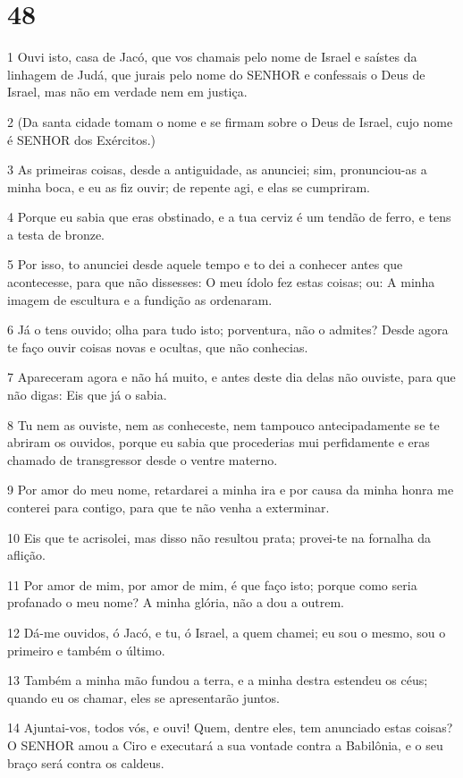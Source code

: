 \chapter{48}

\par 1 Ouvi isto, casa de Jacó, que vos chamais pelo nome de Israel e saístes da linhagem de Judá, que jurais pelo nome do SENHOR e confessais o Deus de Israel, mas não em verdade nem em justiça.
\par 2 (Da santa cidade tomam o nome e se firmam sobre o Deus de Israel, cujo nome é SENHOR dos Exércitos.)
\par 3 As primeiras coisas, desde a antiguidade, as anunciei; sim, pronunciou-as a minha boca, e eu as fiz ouvir; de repente agi, e elas se cumpriram.
\par 4 Porque eu sabia que eras obstinado, e a tua cerviz é um tendão de ferro, e tens a testa de bronze.
\par 5 Por isso, to anunciei desde aquele tempo e to dei a conhecer antes que acontecesse, para que não dissesses: O meu ídolo fez estas coisas; ou: A minha imagem de escultura e a fundição as ordenaram.
\par 6 Já o tens ouvido; olha para tudo isto; porventura, não o admites? Desde agora te faço ouvir coisas novas e ocultas, que não conhecias.
\par 7 Apareceram agora e não há muito, e antes deste dia delas não ouviste, para que não digas: Eis que já o sabia.
\par 8 Tu nem as ouviste, nem as conheceste, nem tampouco antecipadamente se te abriram os ouvidos, porque eu sabia que procederias mui perfidamente e eras chamado de transgressor desde o ventre materno.
\par 9 Por amor do meu nome, retardarei a minha ira e por causa da minha honra me conterei para contigo, para que te não venha a exterminar.
\par 10 Eis que te acrisolei, mas disso não resultou prata; provei-te na fornalha da aflição.
\par 11 Por amor de mim, por amor de mim, é que faço isto; porque como seria profanado o meu nome? A minha glória, não a dou a outrem.
\par 12 Dá-me ouvidos, ó Jacó, e tu, ó Israel, a quem chamei; eu sou o mesmo, sou o primeiro e também o último.
\par 13 Também a minha mão fundou a terra, e a minha destra estendeu os céus; quando eu os chamar, eles se apresentarão juntos.
\par 14 Ajuntai-vos, todos vós, e ouvi! Quem, dentre eles, tem anunciado estas coisas? O SENHOR amou a Ciro e executará a sua vontade contra a Babilônia, e o seu braço será contra os caldeus.
